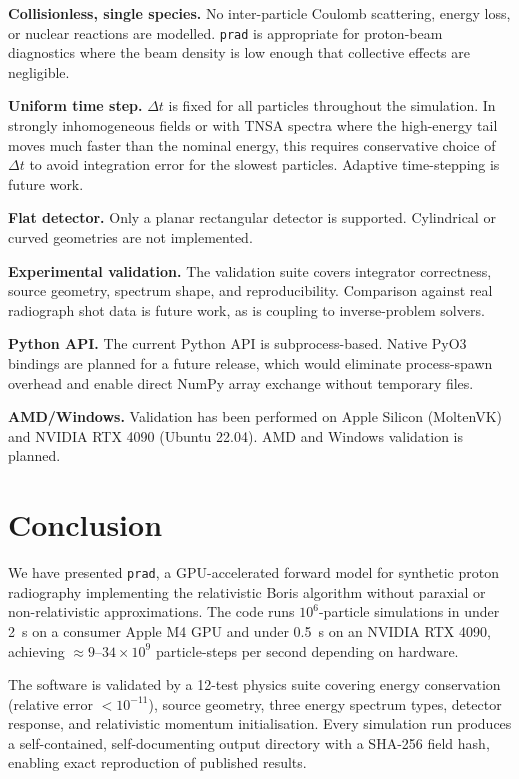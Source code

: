 \documentclass[review,12pt]{elsarticle}
\begin{document}
\textbf{Collisionless, single species.} No inter-particle Coulomb scattering, energy
loss, or nuclear reactions are modelled. \texttt{prad} is appropriate for
proton-beam diagnostics where the beam density is low enough that collective effects
are negligible.

\textbf{Uniform time step.} $\Delta t$ is fixed for all particles throughout the
simulation. In strongly inhomogeneous fields or with TNSA spectra where the high-energy
tail moves much faster than the nominal energy, this requires conservative choice of
$\Delta t$ to avoid integration error for the slowest particles. Adaptive time-stepping
is future work.

\textbf{Flat detector.} Only a planar rectangular detector is supported. Cylindrical
or curved geometries are not implemented.

\textbf{Experimental validation.} The validation suite covers integrator correctness,
source geometry, spectrum shape, and reproducibility. Comparison against real
radiograph shot data is future work, as is coupling to inverse-problem solvers.

\textbf{Python API.} The current Python API is subprocess-based. Native PyO3 bindings
are planned for a future release, which would eliminate process-spawn overhead and
enable direct NumPy array exchange without temporary files.

\textbf{AMD/Windows.} Validation has been performed on Apple Silicon (MoltenVK) and
NVIDIA RTX 4090 (Ubuntu 22.04). AMD and Windows validation is planned.

\section{Conclusion}
\label{sec:conclusion}

We have presented \texttt{prad}, a GPU-accelerated forward model for synthetic proton
radiography implementing the relativistic Boris algorithm without paraxial or
non-relativistic approximations. The code runs $10^6$-particle simulations in under
\SI{2}{\second} on a consumer Apple M4 GPU and under \SI{0.5}{\second} on an NVIDIA
RTX 4090, achieving $\approx 9$--$34 \times 10^9$ particle-steps per second depending
on hardware.

The software is validated by a 12-test physics suite covering energy conservation
(relative error $< 10^{-11}$), source geometry, three energy spectrum types,
detector response, and relativistic momentum initialisation. Every simulation run
produces a self-contained, self-documenting output directory with a SHA-256 field
hash, enabling exact reproduction of published results.
\end{document}
